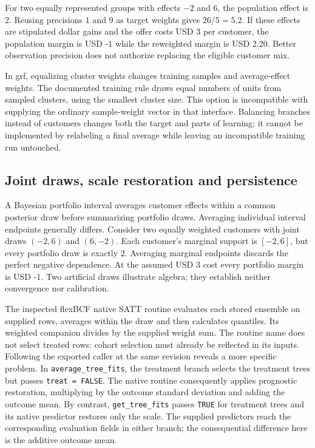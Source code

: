 For two equally represented groups with effects $-2$ and $6$, the population effect is $2$. Reusing precisions $1$ and $9$ as target weights gives $26/5=5.2$. If these effects are stipulated dollar gains and the offer costs USD 3 per customer, the population margin is USD -1 while the reweighted margin is USD 2.20. Better observation precision does not authorize replacing the eligible customer mix.~\citep{exec21_cxx_reference}

In grf, equalizing cluster weights changes training samples and average-effect weights. The documented training rule draws equal numbers of units from sampled clusters, using the smallest cluster size. This option is incompatible with supplying the ordinary sample-weight vector in that interface. Balancing branches instead of customers changes both the target and parts of learning; it cannot be implemented by relabeling a final average while leaving an incompatible training run untouched.~\citep{exec21_cxx_grf}

\subsection{Joint draws, scale restoration and persistence}
\label{exec21:cxx-draws}
A Bayesian portfolio interval averages customer effects within a common posterior draw before summarizing portfolio draws. Averaging individual interval endpoints generally differs. Consider two equally weighted customers with joint draws $(-2,6)$ and $(6,-2)$. Each customer's marginal support is $[-2,6]$, but every portfolio draw is exactly $2$. Averaging marginal endpoints discards the perfect negative dependence. At the assumed USD 3 cost every portfolio margin is USD -1. Two artificial draws illustrate algebra; they establish neither convergence nor calibration.~\citep{exec21_cxx_reference}

The inspected flexBCF native SATT routine evaluates each stored ensemble on supplied rows, averages within the draw and then calculates quantiles. Its weighted companion divides by the supplied weight sum. The routine name does not select treated rows: cohort selection must already be reflected in its inputs. Following the exported caller at the same revision reveals a more specific problem. In \texttt{average\_tree\_fits}, the treatment branch selects the treatment trees but passes \texttt{treat = FALSE}. The native routine consequently applies prognostic restoration, multiplying by the outcome standard deviation and adding the outcome mean. By contrast, \texttt{get\_tree\_fits} passes \texttt{TRUE} for treatment trees and its native predictor restores only the scale. The supplied predictors reach the corresponding evaluation fields in either branch; the consequential difference here is the additive outcome mean.~\citep{exec21_cxx_flexbcf,rel16flexcallers}

